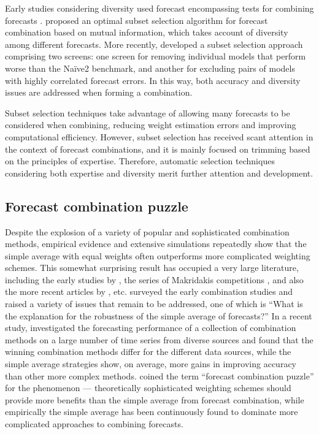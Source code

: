 \documentclass[a4paper,11pt]{article}
\begin{document}
Early studies considering diversity used forecast encompassing tests for combining forecasts \citep[e.g.,][]{encompassing2010,COSTANTINI2010725}. \citet{Cang2014-tp} proposed an optimal subset selection algorithm for forecast combination based on mutual information, which takes account of diversity among different forecasts. More recently, \citet{Lichtendahl2020-ut} developed a subset selection approach comprising two screens: one screen for removing individual models that perform worse than the Na\"{i}ve2 benchmark, and another for excluding pairs of models with highly correlated forecast errors. In this way, both accuracy and diversity issues are addressed when forming a combination.

Subset selection techniques take advantage of allowing many forecasts to be considered when combining, reducing weight estimation errors and improving computational efficiency. However, subset selection has received scant attention in the context of forecast combinations, and it is mainly focused on trimming based on the principles of expertise. Therefore, automatic selection techniques considering both expertise and diversity merit further attention and development.

\subsection{Forecast combination puzzle}
\label{sec:puzzle}

Despite the explosion of a variety of popular and sophisticated combination methods, empirical evidence and extensive simulations repeatedly show that the simple average with equal weights often outperforms more complicated weighting schemes. This somewhat surprising result has occupied a very large literature, including the early studies by \citet{Stock1998-np,Stock2003-sp,Stock2004-rq}, the series of Makridakis competitions \citep{Makridakis1982-hb,Makridakis2000-he,Makridakis2020-hu}, and also the more recent articles by \citet{Blanc2016-sn,Blanc2020-pg}, etc. \citet{Clemen1989-fb} surveyed the early combination studies and raised a variety of issues that remain to be addressed, one of which is ``What is the explanation for the robustness of the simple average of forecasts?'' In a recent study, \citet{Gastinger2021-ey} investigated the forecasting performance of a collection of combination methods on a large number of time series from diverse sources and found that the winning combination methods differ for the different data sources, while the simple average strategies show, on average, more gains in improving accuracy than other more complex methods. \citet{Stock2004-rq} coined the term ``forecast combination puzzle'' for the phenomenon --- theoretically sophisticated weighting schemes should provide more benefits than the simple average from forecast combination, while empirically the simple average has been continuously found to dominate more complicated approaches to combining forecasts.
\end{document}

